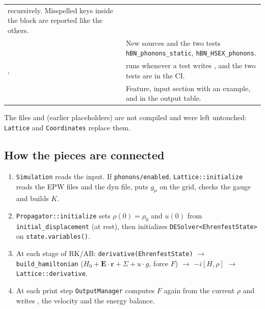 \documentclass[11pt]{article}
\begin{document}
\begin{center}
\begin{tabularx}{\textwidth}{@{}>{\raggedright\arraybackslash}p{4.6cm}L@{}}
recursively. Misspelled keys inside the block are reported like the others. \\[2pt]
 &
New sources and the two tests \texttt{hBN\_phonons\_static}, \texttt{hBN\_HSEX\_phonons}. \\[2pt]
,  &
 runs whenever a test writes , and the two tests are in the CI. \\[2pt]
 &
Feature, input section with an example, and  in the output table. \\
\bottomrule
\end{tabularx}
\end{center}
The files  and  (earlier placeholders) are not compiled and were
left untouched: \texttt{Lattice} and \texttt{Coordinates} replace them.

\subsection{How the pieces are connected}
\begin{enumerate}
\item \texttt{Simulation} reads the input. If \texttt{phonons/enabled}, \texttt{Lattice::initialize} reads the EPW files
  and the dyn file, puts $g_\mu$ on the grid, checks the gauge and builds $K$.
\item \texttt{Propagator::initialize} sets $\rho(0)=\rho_0$ and $u(0)$ from \texttt{initial\_displacement} (at rest),
  then initializes \texttt{DESolver<EhrenfestState>} on \texttt{state.variables()}.
\item At each stage of RK/AB: \texttt{derivative(EhrenfestState)} $\to$ \texttt{build\_hamiltonian}
  ($H_0+\mathbf E\cdot\mathbf r+\Sigma+u\cdot g$, force $F$) $\to$ $-i[H,\rho]$ $\to$ \texttt{Lattice::derivative}.
\item At each print step \texttt{OutputManager} computes $F$ again from the current $\rho$ and writes
  , the velocity and the energy balance.
\end{enumerate}
\end{document}
